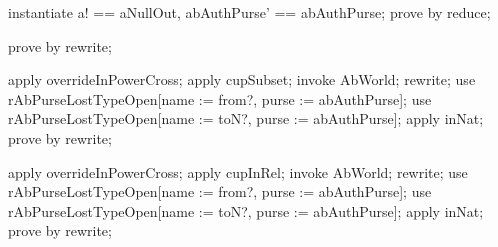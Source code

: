 \begin{LPScript}\begin{zproof}[tAbWorldSecureOpPRE]
    instantiate a! == aNullOut, abAuthPurse' == abAuthPurse;
    prove by reduce;
\end{zproof}\end{LPScript}

\begin{LDCheck}\begin{zproof}
    prove by rewrite;
\end{zproof}\end{LDCheck}

\begin{LPScript}\begin{zproof}[lAbTransferOkayPREAuthPurseUpdateMaxType]
    apply overrideInPowerCross;
    apply cupSubset;
    invoke AbWorld;
    rewrite;
    use rAbPurseLostTypeOpen[name := from?, purse := abAuthPurse];
    use rAbPurseLostTypeOpen[name := toN?, purse := abAuthPurse];
    apply inNat;
    prove by rewrite;
\end{zproof}\end{LPScript}

\begin{LPScript}\begin{zproof}[lAbTransferOkayPREAuthPurseMaxType]
    apply overrideInPowerCross;
    apply cupInRel;
    invoke AbWorld;
    rewrite;
    use rAbPurseLostTypeOpen[name := from?, purse := abAuthPurse];
    use rAbPurseLostTypeOpen[name := toN?, purse := abAuthPurse];
    apply inNat;
    prove by rewrite;
\end{zproof}\end{LPScript}

